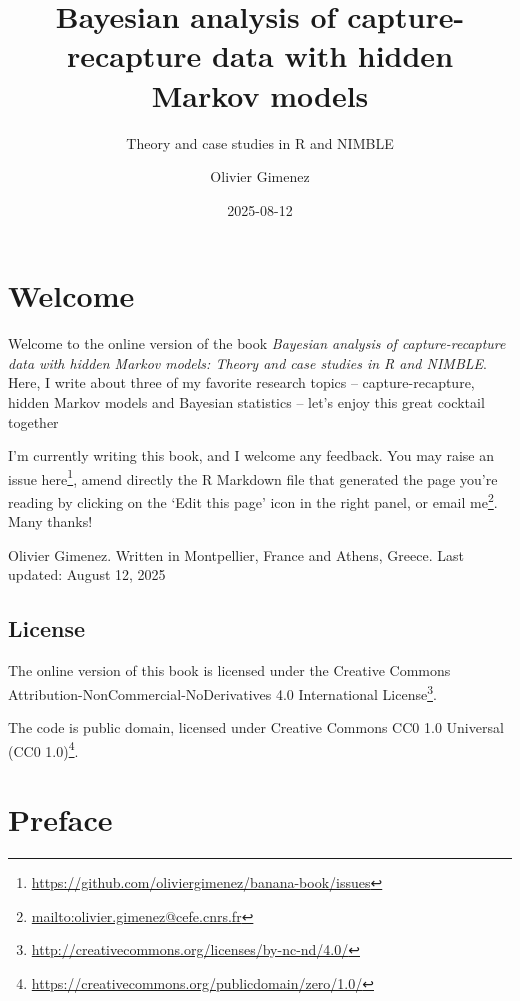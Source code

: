\documentclass[
  12pt,
]{krantz}
\title{Bayesian analysis of capture-recapture data with hidden Markov models}
\subtitle{Theory and case studies in R and NIMBLE}
\author{Olivier Gimenez}
\date{2025-08-12}
\renewcommand{\href}[2]{#2\footnote{\url{#1}}}
\begin{document}
\maketitle

\thispagestyle{empty}

\setlength{\abovedisplayskip}{-5pt}
\setlength{\abovedisplayshortskip}{-5pt}

{
\hypersetup{linkcolor=}
\setcounter{tocdepth}{2}
\tableofcontents
}
\listoffigures
\listoftables
\chapter*{Welcome}\label{welcome}


Welcome to the online version of the book \emph{Bayesian analysis of capture-recapture data with hidden Markov models: Theory and case studies in R and NIMBLE}. Here, I write about three of my favorite research topics -- capture-recapture, hidden Markov models and Bayesian statistics -- let's enjoy this great cocktail together 🍹

I'm currently writing this book, and I welcome any feedback. You may raise an issue \href{https://github.com/oliviergimenez/banana-book/issues}{here}, amend directly the R Markdown file that generated the page you're reading by clicking on the `Edit this page' icon in the right panel, or \href{mailto:olivier.gimenez@cefe.cnrs.fr}{email me}. Many thanks!

Olivier Gimenez. Written in Montpellier, France and Athens, Greece.
Last updated: August 12, 2025

\section*{License}\label{license}


The online version of this book is licensed under the \href{http://creativecommons.org/licenses/by-nc-nd/4.0/}{Creative Commons Attribution-NonCommercial-NoDerivatives 4.0 International License}.

The code is public domain, licensed under \href{https://creativecommons.org/publicdomain/zero/1.0/}{Creative Commons CC0 1.0 Universal (CC0 1.0)}.

\chapter*{Preface}\label{preface}
\end{document}
